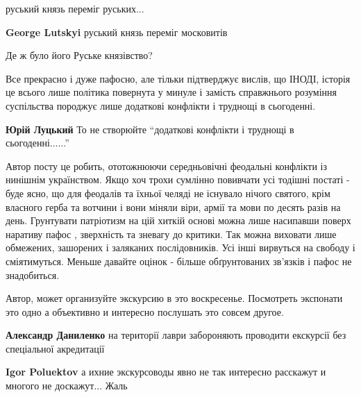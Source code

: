 \begin{itemize}
руський князь переміг руських...

\begin{itemize} %
\textbf{George Lutskyi} руський князь переміг московитів

Де ж було його Руське князівство?

\begin{itemize} %

Все прекрасно і дуже пафосно, але тільки підтверджує вислів, що ІНОДІ, історія
це всього лише політика повернута у минуле і замість справжнього розуміння
суспільства породжує лише додаткові конфлікти і труднощі в сьогоденні.


\textbf{Юрій Луцький} То не створюйте \enquote{додаткові конфлікти і труднощі в сьогоденні......}


Автор посту це робить, ототожнюючи середньовічні феодальні конфлікти із
нинішнім українством. Якщо хоч трохи сумлінно повивчати усі тодішні постаті -
буде ясно, що для феодалів та їхньої челяді не існувало нічого святого, крім
власного герба та вотчини і вони міняли віри, армії та мови по десять разів на
день. Грунтувати патріотизм на цій хиткій основі можна лише насипавши поверх
наративу пафос , зверхність та зневагу до критики. Так можна виховати лише
обмежених, зашорених і заляканих послідовників. Усі інші вирвуться на свободу і
сміятимуться. Меньше давайте оцінок - більше обґрунтованих зв'язків і пафос не
знадобиться.

\end{itemize} %

\end{itemize} %

Автор, может организуйте экскурсию в это воскресенье.
Посмотреть экспонати это одно а объективно и интересно послушать это совсем другое.

\begin{itemize} %
\textbf{Александр Даниленко} на території лаври забороняють проводити екскурсії без спеціальної акредитації

\textbf{Igor Poluektov} а ихние экскурсоводы явно не так интересно расскажут и многого не доскажут...
Жаль
\end{itemize} %

\end{itemize} %
